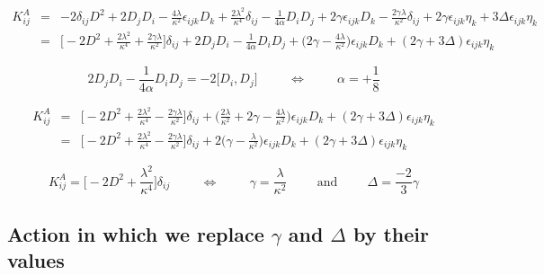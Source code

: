 \documentclass[a4paper,11pt]{article} %
\numberwithin{equation}{section} %
\numberwithin{figure}{section} %
\theoremstyle{plain} %
\theoremstyle{definition} %
\theoremstyle{remark} %
\begin{document}
\begin{eqnarray*}
 K^{A}_{ij} &=& - 2 \delta_{ij} D^2 + 2 D_j D_i - \frac{4\lambda}{\kappa^2} \epsilon_{ijk}  D_k + \frac{2\lambda^2}{\kappa^4} \delta_{ij} - \frac{1}{4 \alpha} D_i D_j + 2 \gamma \epsilon_{ijk} D_k - \frac{2 \gamma \lambda}{\kappa^{2}} \delta_{ij} + 2 \gamma \epsilon_{ijk} \eta_{k} + 3 \Delta \epsilon_{ijk} \eta_k \\
            &=& \Big[ -2 D^2 + \frac{2\lambda^2}{\kappa^4} + \frac{2 \gamma \lambda}{\kappa^{2}} \Big] \delta_{ij} + 2 D_j D_i - \frac{1}{4 \alpha} D_i D_j + \big( 2 \gamma - \frac{4 \lambda}{\kappa^2} \big) \epsilon_{ijk} D_k + (2 \gamma + 3 \Delta) \epsilon_{ijk} \eta_k 
\end{eqnarray*}

\begin{equation*}
 2 D_j D_i - \frac{1}{4 \alpha} D_i D_j = - 2 \big[ D_i , D_j \big] \hspace{1cm} \Longleftrightarrow \hspace{1cm} \alpha = + \frac{1}{8}
\end{equation*}

\begin{eqnarray*}
 K^{A}_{ij} &=& \Big[ -2 D^2 + \frac{2\lambda^2}{\kappa^4} - \frac{2 \gamma \lambda}{\kappa^{2}} \Big] \delta_{ij} + \big( \frac{2 \lambda}{\kappa^2} + 2 \gamma - \frac{4 \lambda}{\kappa^2} \big) \epsilon_{ijk} D_k + (2 \gamma + 3 \Delta) \epsilon_{ijk} \eta_k \\
            &=& \Big[ -2 D^2 + \frac{2\lambda^2}{\kappa^4} - \frac{2 \gamma \lambda}{\kappa^{2}} \Big] \delta_{ij} + 2 \big( \gamma - \frac{\lambda}{\kappa^2} \big) \epsilon_{ijk} D_k + (2 \gamma + 3 \Delta) \epsilon_{ijk} \eta_k 
\end{eqnarray*}

\begin{equation*}
 K^{A}_{ij} = \Big[ -2 D^2 + \frac{\lambda^2}{\kappa^4}\Big] \delta_{ij} \hspace{1cm} \Longleftrightarrow \hspace{1cm} \gamma = \frac{ \lambda}{\kappa^2} \hspace{1cm} \text{and} \hspace{1cm} \Delta = \frac{-2}{3} \gamma
\end{equation*}

\subsection*{Action in which we replace $\gamma$ and $\Delta$ by their values}
\end{document}

